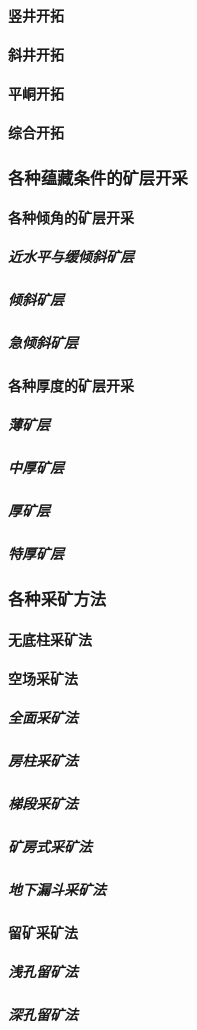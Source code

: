 \documentclass[UTF8]{../../ApplicationUniverse}
\begin{document}
            \paragraph{竖井开拓}
            \paragraph{斜井开拓}
            \paragraph{平峒开拓}
            \paragraph{综合开拓}
        \subsubsection{各种蕴藏条件的矿层开采}
            \paragraph{各种倾角的矿层开采}
                \subparagraph{近水平与缓倾斜矿层}
                \subparagraph{倾斜矿层}
                \subparagraph{急倾斜矿层}
            \paragraph{各种厚度的矿层开采}
                \subparagraph{薄矿层}
                \subparagraph{中厚矿层}
                \subparagraph{厚矿层}
                \subparagraph{特厚矿层}
        \subsubsection{各种采矿方法}
            \paragraph{无底柱采矿法}
            \paragraph{空场采矿法}
                \subparagraph{全面采矿法}
                \subparagraph{房柱采矿法}
                \subparagraph{梯段采矿法}
                \subparagraph{矿房式采矿法}
                \subparagraph{地下漏斗采矿法}
            \paragraph{留矿采矿法}
                \subparagraph{浅孔留矿法}
                \subparagraph{深孔留矿法}
\end{document}
